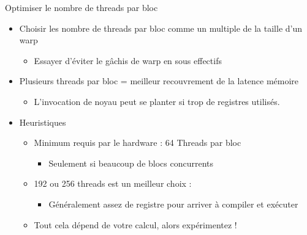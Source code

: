 \documentclass[handout,francais]{beamer}
\begin{document}
\begin{frame}{Optimiser le nombre de threads par bloc}

  \begin{itemize}
  \item Choisir les nombre de threads par bloc comme un multiple de la taille d'un warp
    \begin{itemize}
    \item Essayer d'éviter le gâchis de warp en sous effectifs
    \end{itemize}
  \item Plusieurs threads par bloc = meilleur recouvrement de la latence mémoire
    \begin{itemize}
    \item L'invocation de noyau peut se planter si trop de registres utilisés.
    \end{itemize}
  \item Heuristiques
    \begin{itemize}
    \item Minimum requis par le hardware : 64 Threads par bloc
      \begin{itemize}
      \item Seulement si beaucoup de blocs concurrents
      \end{itemize}
    \item 192 ou 256 threads est un meilleur choix  : 
      \begin{itemize}
      \item Généralement assez de registre pour arriver à compiler et exécuter
      \end{itemize}
    \item Tout cela dépend de votre calcul, alors expérimentez !
    \end{itemize}
  \end{itemize}
\end{frame}
\end{document}
